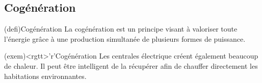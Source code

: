 \documentclass[../../main/main.tex]{subfiles}
\begin{document}
\subsection{Cogénération}
\begin{tcbraster}[raster equal height=rows, raster columns=2]
  \begin{tcb}(defi){Cogénération}
  La cogénération est un principe visant à valoriser toute l'énergie grâce à une
  production simultanée de plusieurs formes de puissance.
\end{tcb}
\begin{tcb}(exem)<rgtt>'r'{Cogénération}
  Les centrales électrique créent également beaucoup de chaleur. Il peut être
  intelligent de la récupérer afin de chauffer directement les habitations
  environnantes.
\end{tcb}
\end{tcbraster}
\end{document}

